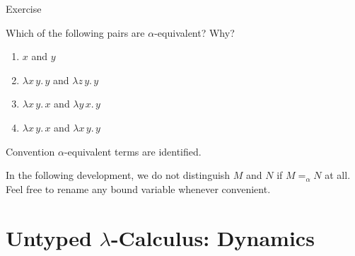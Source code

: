 \begin{frame}{Exercise}

Which of the following pairs are $\alpha$-equivalent? Why?
\begin{enumerate}
  \item $x$ and $y$
  \item $\lambda x\,y.\, y$ and $\lambda z\,y.\, y$
  \item $\lambda x\,y.\, x$ and $\lambda y\,x.\, y$
  \item $\lambda x\,y.\, x$ and $\lambda x\,y.\, y$
\end{enumerate}

\begin{block}{Convention}
  $\alpha$-equivalent terms are identified. 
\end{block}

In the following development, we do not distinguish $M$ and $N$ if $M
=_\alpha N$ at all. Feel free to rename any bound variable whenever
convenient.

\end{frame}

\section{Untyped $\lambda$-Calculus: Dynamics}
%
%

